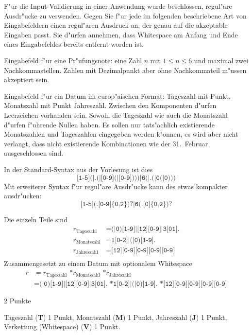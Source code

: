 F"ur die Input-Validierung in einer Anwendung wurde beschlossen, regul"are
Ausdr"ucke zu verwenden.
Gegen Sie f"ur jede im folgenden beschriebene Art von Eingabefeldern einen
regul"aren Ausdruck an, der genau auf die akzeptable Eingaben passt.
Sie d"urfen annehmen, dass Whitespace am Anfang und Ende eines Eingabefeldes
bereits entfernt worden ist.
\begin{teilaufgaben}
\item
Eingabefeld f"ur eine Pr"ufungsnote: eine Zahl $n$ mit $1\le n\le 6$
und maximal zwei Nachkommastellen.
Zahlen mit Dezimalpunkt aber ohne Nachkommateil m"ussen akzeptiert sein.
\item
Eingabefeld f"ur ein Datum im europ"aischen Format: Tageszahl mit Punkt,
Monatszahl mit Punkt Jahreszahl. Zwischen den Komponenten d"urfen Leerzeichen
vorhanden sein.
Sowohl die Tageszahl wie auch die Monatszahl d"urfen f"uhrende Nullen haben.
Es sollen nur tats"achlich existierende Monatszahlen
und Tageszahlen eingegeben werden k"onnen, es wird aber nicht verlangt,
dass nicht existierende Kombinationen wie der 31.~Februar ausgeschlossen
sind.
\end{teilaufgaben}

\begin{loesung}
\begin{teilaufgaben}
\item In der Standard-Syntax aus der Vorlesung ist dies
\[
\texttt{[1-5](|.(|[0-9](|[0-9])))|6(|.(|0(|0)))}
\]
Mit erweiterer Syntax f"ur regul"are Ausdr"ucke kann des etwas kompakter
ausdr"ucken:
\[
\texttt{[1-5](.[0-9]\{0,2\})?|6(.[0]\{0,2\})?}
\]
\item Die einzeln Teile sind
\begin{align*}
r_{\text{Tageszahl}}
&=
\texttt{(|0)[1-9]|[12][0-9]|3[01].}
\\
r_{\text{Monatszahl}}
&=
\texttt{1[0-2]|(|0)[1-9].}
\\
r_{\text{Jahreszahl}}
&=
\texttt{[12][0-9][0-9][0-9][0-9]}
\\
\end{align*}
Zusammengesetzt zu einem Datum mit optionalem Whitespace
\begin{align*}
r
&=
r_{\text{Tageszahl}}
\texttt{ *}
r_{\text{Monatszahl}}
\texttt{ *}
r_{\text{Jahreszahl}}
\\
&=
\texttt{(|0)[1-9]|[12][0-9]|3[01].}
\texttt{ *}
\texttt{1[0-2]|(|0)[1-9].}
\texttt{ *}
\texttt{[12][0-9][0-9][0-9][0-9]}
\end{align*}
\end{teilaufgaben}
\end{loesung}

\begin{bewertung}
\begin{teilaufgaben}
\item 2 Punkte
\item Tageszahl ({\bf T}) 1 Punkt, Monatszahl ({\bf M}) 1 Punkt,
Jahreszahl ({\bf J}) 1 Punkt, Verkettung (Whitespace) ({\bf V}) 1 Punkt.
\end{teilaufgaben}
\end{bewertung}

